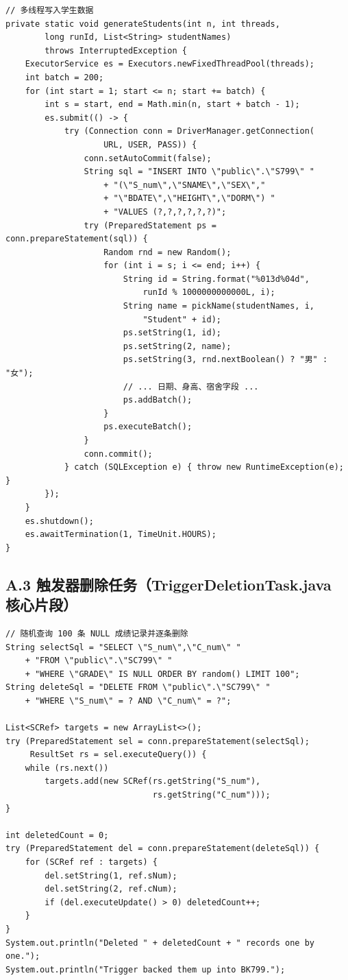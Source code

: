 \documentclass[12pt,a4paper]{ctexart}
\begin{document}
\begin{lstlisting}[style=javastyle]
// 多线程写入学生数据
private static void generateStudents(int n, int threads,
        long runId, List<String> studentNames)
        throws InterruptedException {
    ExecutorService es = Executors.newFixedThreadPool(threads);
    int batch = 200;
    for (int start = 1; start <= n; start += batch) {
        int s = start, end = Math.min(n, start + batch - 1);
        es.submit(() -> {
            try (Connection conn = DriverManager.getConnection(
                    URL, USER, PASS)) {
                conn.setAutoCommit(false);
                String sql = "INSERT INTO \"public\".\"S799\" "
                    + "(\"S_num\",\"SNAME\",\"SEX\","
                    + "\"BDATE\",\"HEIGHT\",\"DORM\") "
                    + "VALUES (?,?,?,?,?,?)";
                try (PreparedStatement ps = conn.prepareStatement(sql)) {
                    Random rnd = new Random();
                    for (int i = s; i <= end; i++) {
                        String id = String.format("%013d%04d",
                            runId % 1000000000000L, i);
                        String name = pickName(studentNames, i,
                            "Student" + id);
                        ps.setString(1, id);
                        ps.setString(2, name);
                        ps.setString(3, rnd.nextBoolean() ? "男" : "女");
                        // ... 日期、身高、宿舍字段 ...
                        ps.addBatch();
                    }
                    ps.executeBatch();
                }
                conn.commit();
            } catch (SQLException e) { throw new RuntimeException(e); }
        });
    }
    es.shutdown();
    es.awaitTermination(1, TimeUnit.HOURS);
}
\end{lstlisting}

\subsection*{A.3 触发器删除任务（TriggerDeletionTask.java 核心片段）}

\begin{lstlisting}[style=javastyle]
// 随机查询 100 条 NULL 成绩记录并逐条删除
String selectSql = "SELECT \"S_num\",\"C_num\" "
    + "FROM \"public\".\"SC799\" "
    + "WHERE \"GRADE\" IS NULL ORDER BY random() LIMIT 100";
String deleteSql = "DELETE FROM \"public\".\"SC799\" "
    + "WHERE \"S_num\" = ? AND \"C_num\" = ?";

List<SCRef> targets = new ArrayList<>();
try (PreparedStatement sel = conn.prepareStatement(selectSql);
     ResultSet rs = sel.executeQuery()) {
    while (rs.next())
        targets.add(new SCRef(rs.getString("S_num"),
                              rs.getString("C_num")));
}

int deletedCount = 0;
try (PreparedStatement del = conn.prepareStatement(deleteSql)) {
    for (SCRef ref : targets) {
        del.setString(1, ref.sNum);
        del.setString(2, ref.cNum);
        if (del.executeUpdate() > 0) deletedCount++;
    }
}
System.out.println("Deleted " + deletedCount + " records one by one.");
System.out.println("Trigger backed them up into BK799.");
\end{lstlisting}
\end{document}
